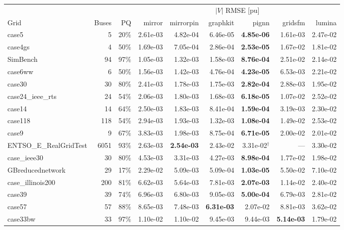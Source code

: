 \documentclass[10pt]{article}
\begin{document}
\begin{landscape}
\begin{table}[H]
\centering\scriptsize
\begin{tabular}{lrr rrrrrr}
\toprule
 & & & \multicolumn{6}{c}{$|V|$ RMSE [pu]} \\
\cmidrule(lr){4-9}
Grid & Buses & PQ & mirror & mirrorpin & graphkit & pignn & gridsfm & lumina \\
\midrule
case5 & 5 & 20\% & 2.61e-03 & 4.82e-04 & 6.46e-05 & \textbf{4.85e-06} & 1.61e-03 & 2.47e-02 \\
case4gs & 4 & 50\% & 1.69e-03 & 7.05e-04 & 2.86e-04 & \textbf{2.53e-05} & 1.67e-02 & 1.81e-02 \\
SimBench & 94 & 97\% & 1.05e-03 & 1.32e-03 & 1.58e-03 & \textbf{8.76e-04} & 2.51e-02 & 2.14e-02 \\
case6ww & 6 & 50\% & 1.56e-03 & 1.42e-03 & 4.76e-04 & \textbf{4.23e-05} & 6.53e-03 & 2.21e-02 \\
case30 & 30 & 80\% & 2.41e-03 & 1.78e-03 & 1.75e-03 & \textbf{2.82e-04} & 2.88e-03 & 1.95e-02 \\
case24\_ieee\_rts & 24 & 54\% & 2.06e-03 & 1.80e-03 & 1.68e-03 & \textbf{6.18e-05} & 1.07e-02 & 2.52e-02 \\
case14 & 14 & 64\% & 2.50e-03 & 1.83e-03 & 8.41e-04 & \textbf{1.59e-04} & 3.19e-03 & 2.30e-02 \\
case118 & 118 & 54\% & 2.94e-03 & 1.93e-03 & 1.32e-03 & \textbf{1.08e-04} & 1.49e-02 & 2.53e-02 \\
case9 & 9 & 67\% & 3.83e-03 & 1.98e-03 & 8.75e-04 & \textbf{6.71e-05} & 2.00e-02 & 2.01e-02 \\
ENTSO\_E\_RealGridTest & 6051 & 93\% & 2.63e-03 & \textbf{2.54e-03} & 2.43e-02 & 3.31e-02$^\dagger$ & --- & 3.30e-02 \\
case\_ieee30 & 30 & 80\% & 4.53e-03 & 3.31e-03 & 4.27e-03 & \textbf{8.98e-04} & 1.77e-02 & 1.98e-02 \\
GBreducednetwork & 29 & 17\% & 2.29e-02 & 5.09e-03 & 5.09e-04 & \textbf{1.03e-05} & 5.50e-02 & 7.10e-02 \\
case\_illinois200 & 200 & 81\% & 6.62e-03 & 5.64e-03 & 7.81e-03 & \textbf{2.07e-03} & 1.14e-02 & 2.40e-02 \\
case39 & 39 & 74\% & 6.96e-03 & 6.80e-03 & 9.05e-03 & \textbf{5.00e-04} & 6.79e-03 & 2.81e-02 \\
case57 & 57 & 88\% & 8.65e-03 & 7.48e-03 & \textbf{6.31e-03} & 2.07e-02 & 8.81e-03 & 3.62e-02 \\
case33bw & 33 & 97\% & 1.10e-02 & 1.10e-02 & 9.45e-03 & 9.44e-03 & \textbf{5.14e-03} & 1.79e-02 \\

\end{tabular}
\end{table}
\end{landscape}
\end{document}
